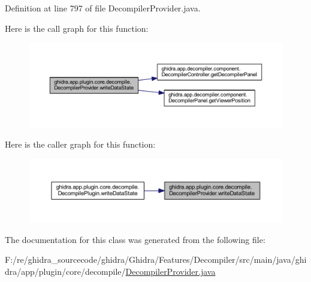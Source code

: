 Definition at line 797 of file Decompiler\+Provider.\+java.

Here is the call graph for this function\+:
\nopagebreak
\begin{figure}[H]
\begin{center}
\leavevmode
\includegraphics[width=350pt]{classghidra_1_1app_1_1plugin_1_1core_1_1decompile_1_1_decompiler_provider_afb67ba4cd117c62a268993e9cdf9a9db_cgraph}
\end{center}
\end{figure}
Here is the caller graph for this function\+:
\nopagebreak
\begin{figure}[H]
\begin{center}
\leavevmode
\includegraphics[width=350pt]{classghidra_1_1app_1_1plugin_1_1core_1_1decompile_1_1_decompiler_provider_afb67ba4cd117c62a268993e9cdf9a9db_icgraph}
\end{center}
\end{figure}


The documentation for this class was generated from the following file\+:\begin{DoxyCompactItemize}
\item 
F\+:/re/ghidra\+\_\+sourcecode/ghidra/\+Ghidra/\+Features/\+Decompiler/src/main/java/ghidra/app/plugin/core/decompile/\mbox{\hyperlink{_decompiler_provider_8java}{Decompiler\+Provider.\+java}}\end{DoxyCompactItemize}
